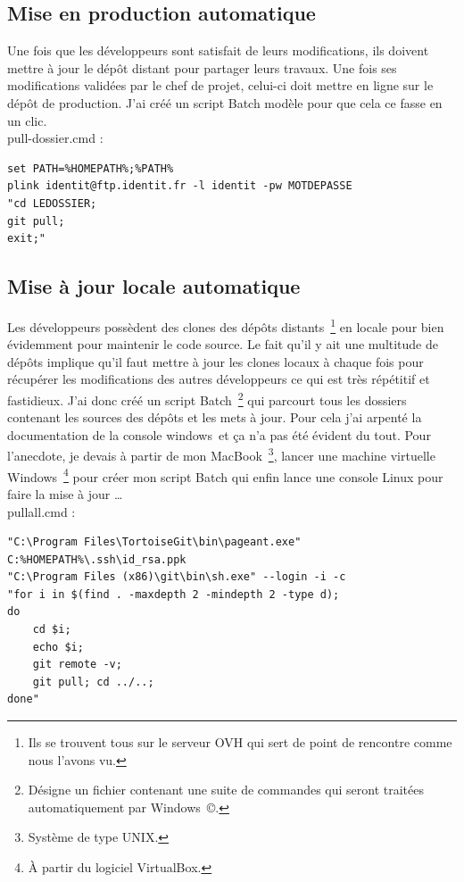 
\subsection{Mise en production automatique} %

Une fois que les développeurs sont satisfait de leurs modifications, ils
doivent mettre à jour le dépôt distant pour partager leurs travaux. Une fois
ses modifications validées par le chef de projet, celui-ci doit mettre en ligne
sur le dépôt de production. J'ai créé un script Batch \og modèle \fg{} pour
que cela ce fasse en un clic.\\
pull-dossier.cmd :
\begin{lstlisting}
set PATH=%HOMEPATH%;%PATH%
plink identit@ftp.identit.fr -l identit -pw MOTDEPASSE
"cd LEDOSSIER;
git pull;
exit;"
\end{lstlisting}


\subsection{Mise à jour locale automatique} %

Les développeurs possèdent des clones des dépôts distants\, \footnote{Ils se
trouvent tous sur le serveur OVH qui sert de point de rencontre comme nous
l'avons vu.} en locale pour bien évidemment pour maintenir le code source. Le
fait qu'il y ait une multitude de dépôts implique qu'il faut mettre à jour les
clones locaux à chaque fois pour récupérer les modifications des autres
développeurs ce qui est très répétitif et fastidieux. J'ai donc créé un script
Batch\, \footnote{Désigne un fichier contenant une suite de commandes qui
seront traitées automatiquement par Windows\, \copyright.} qui parcourt tous les
dossiers contenant les sources des dépôts et les mets à jour. Pour cela j'ai
arpenté la documentation de la console windows\, et ça n'a pas été évident du
tout. Pour l'anecdote, je devais à partir de mon MacBook\, \footnote{Système de
type UNIX.}, lancer une machine virtuelle Windows\, \footnote{À partir du
logiciel VirtualBox.} pour créer mon script Batch qui enfin lance une console
Linux pour faire la mise à jour \ldots{} \\
pullall.cmd :
\begin{lstlisting}
"C:\Program Files\TortoiseGit\bin\pageant.exe"
C:%HOMEPATH%\.ssh\id_rsa.ppk
"C:\Program Files (x86)\git\bin\sh.exe" --login -i -c
"for i in $(find . -maxdepth 2 -mindepth 2 -type d);
do
    cd $i;
    echo $i;
    git remote -v;
    git pull; cd ../..;
done"
\end{lstlisting}

\clearpage
